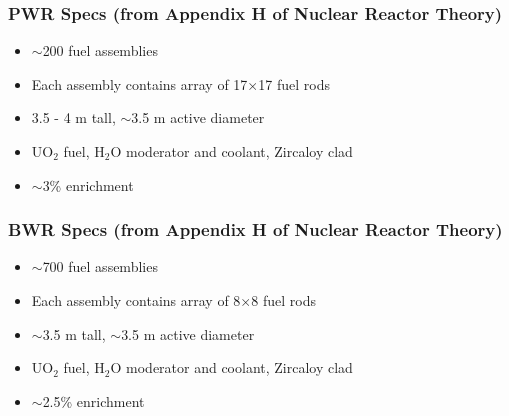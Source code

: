 \documentclass[12pt]{article}
\begin{document}
\subsubsection*{PWR Specs (from Appendix H of Nuclear Reactor Theory)}

\begin{itemize}
\item{$\sim$200 fuel assemblies}
\item{Each assembly contains array of 17$\times$17 fuel rods}
\item{3.5 - 4 m tall, $\sim$3.5 m active diameter}
\item{UO$_2$ fuel, H$_2$O moderator and coolant, Zircaloy clad}
\item{$\sim$3\% enrichment}
\end{itemize}

\subsubsection*{BWR Specs (from Appendix H of Nuclear Reactor Theory)}

\begin{itemize}
\item{$\sim$700 fuel assemblies}
\item{Each assembly contains array of 8$\times$8 fuel rods}
\item{$\sim$3.5 m tall, $\sim$3.5 m active diameter}
\item{UO$_2$ fuel, H$_2$O moderator and coolant, Zircaloy clad}
\item{$\sim$2.5\% enrichment}
\end{itemize}
\end{document}
